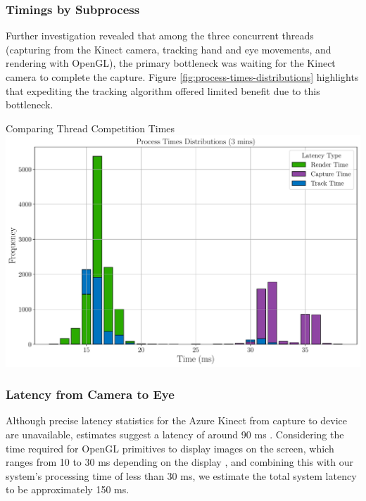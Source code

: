 \subsubsection{Timings by Subprocess}

Further investigation revealed that among the three concurrent threads (capturing from the Kinect camera, tracking hand and eye movements, and rendering with OpenGL), the primary bottleneck was waiting for the Kinect camera to complete the capture. Figure \ref{fig:process-times-distributions} highlights that expediting the tracking algorithm offered limited benefit due to this bottleneck.

\begin{figureBox}[label={fig:process-times-distributions}, width=0.8\linewidth]{Comparing Thread Competition Times}
    \includegraphics[width = 1.0\linewidth]{./evaluation/figures/process-times-distributions.pdf}
\end{figureBox}

\subsubsection{Latency from Camera to Eye}

Although precise latency statistics for the Azure Kinect from capture to device are unavailable, estimates suggest a latency of around 90 ms \cite{gholami2023autodepthnet}. Considering the time required for OpenGL primitives to display images on the screen, which ranges from 10 to 30 ms depending on the display \cite{https://doi.org/10.1002/jsid.1104} \cite{noauthor_latency_nodate}, and combining this with our system's processing time of less than 30 ms, we estimate the total system latency to be approximately 150 ms. \\

